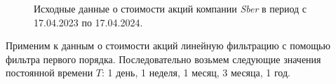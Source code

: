 \documentclass[a5paper, 10pt]{article}
\theoremstyle{definition}
\theoremstyle{plain}
\theoremstyle{remark}
\begin{document}
\begin{figure}[h!]
\caption{Исходные данные о стоимости акций компании \textit{Sber} в период с 17.04.2023 по 17.04.2024.}
\end{figure}
Применим к данным о стоимости акций линейную фильтрацию с помощью фильтра первого порядка. Последовательно возьмем следующие значения постоянной времени $T$: 1 день, 1 неделя, 1 месяц, 3 месяца, 1 год.
\end{document}
